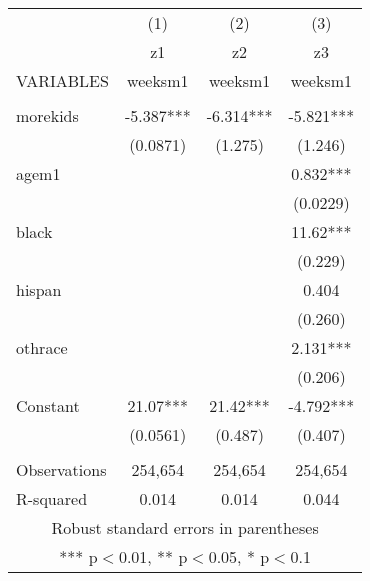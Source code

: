 \documentclass[]{article}
\begin{document}
\begin{tabular}{lccc} \hline
 & (1) & (2) & (3) \\
 & z1 & z2 & z3 \\
VARIABLES & weeksm1 & weeksm1 & weeksm1 \\ \hline
 &  &  &  \\
morekids & -5.387*** & -6.314*** & -5.821*** \\
 & (0.0871) & (1.275) & (1.246) \\
agem1 &  &  & 0.832*** \\
 &  &  & (0.0229) \\
black &  &  & 11.62*** \\
 &  &  & (0.229) \\
hispan &  &  & 0.404 \\
 &  &  & (0.260) \\
othrace &  &  & 2.131*** \\
 &  &  & (0.206) \\
Constant & 21.07*** & 21.42*** & -4.792*** \\
 & (0.0561) & (0.487) & (0.407) \\
 &  &  &  \\
Observations & 254,654 & 254,654 & 254,654 \\
 R-squared & 0.014 & 0.014 & 0.044 \\ \hline
\multicolumn{4}{c}{ Robust standard errors in parentheses} \\
\multicolumn{4}{c}{ *** p$<$0.01, ** p$<$0.05, * p$<$0.1} \\
\end{tabular}
\end{document}
